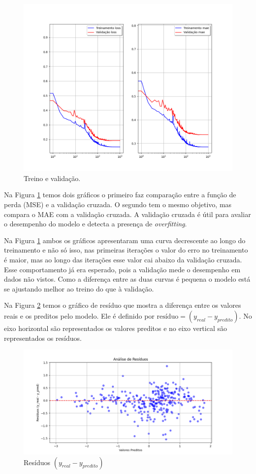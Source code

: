 \documentclass[12pt,a4paper,oneside]{report}
\newcommand{\fig}[1]{Figura \ref{#1}}
\begin{document}
\begin{figure}[h!]
	\centering
	\includegraphics[width=0.7\linewidth]{img/t1_training_validation}
	\caption{Treino e validação.}
	\label{fig:t1trainingvalidation}
\end{figure}
	Na \fig{fig:t1trainingvalidation} temos dois gráficos o primeiro faz comparação entre a função de perda (MSE) e a validação cruzada. O segundo tem o mesmo objetivo, mas compara o MAE com a validação cruzada. A validação cruzada é útil para avaliar o desempenho do modelo e detecta a presença de \textit{overfitting}. 
	

Na \fig{fig:t1trainingvalidation} ambos os gráficos apresentaram uma curva decrescente ao longo do treinamento e não só isso, nas primeiras iterações o valor do erro no treinamento é maior, mas ao longo das iterações esse valor cai abaixo da validação cruzada. Esse comportamento já era esperado, pois a validação mede o desempenho em dados não vistos. Como a diferença entre as duas curvas é pequena o modelo está se ajustando melhor ao treino do que à validação.
	
%	
	
	Na Figura \ref{fig:t1residuos} temos o gráfico de resíduo que mostra a diferença entre os valores reais e os preditos pelo modelo. Ele é definido por $\text{resíduo} = (y_{real} - y_{predito})$. No eixo horizontal são representados os valores preditos e no eixo vertical são representados os resíduos. 
	\begin{figure}[h!]
		\centering
		\includegraphics[width=0.7\linewidth]{img/t1_residuos}
		\caption{Resíduos $(y_{real} - y_{predito})$}
		\label{fig:t1residuos}
	\end{figure}
\end{document}

